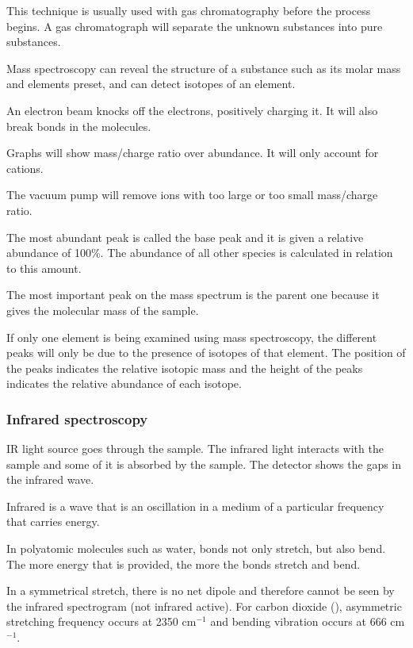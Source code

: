 			This technique is usually used with gas chromatography before the process begins. A gas chromatograph will separate the unknown substances into pure substances.

			Mass spectroscopy can reveal the structure of a substance such as its molar mass and elements preset, and can detect isotopes of an element.

			An electron beam knocks off the electrons, positively charging it. It will also break bonds in the molecules.

			Graphs will show mass/charge ratio over abundance. It will only account for cations.

			The vacuum pump will remove ions with too large or too small mass/charge ratio.

			The most abundant peak is called the base peak and it is given a relative abundance of 100\%. The abundance of all other species is calculated in relation to this amount.

			The most important peak on the mass spectrum is the parent one because it gives the molecular mass of the sample.

			If only one element is being examined using mass spectroscopy, the different peaks will only be due to the presence of isotopes of that element. The position of the peaks indicates the relative isotopic mass and the height of the peaks indicates the relative abundance of each isotope.

		\subsubsection{Infrared spectroscopy}

			IR light source goes through the sample. The infrared light interacts with the sample and some of it is absorbed by the sample. The detector shows the gaps in the infrared wave.

			Infrared is a wave that is an oscillation in a medium of a particular frequency that carries energy.

			In polyatomic molecules such as water, bonds not only stretch, but also bend. The more energy that is provided, the more the bonds stretch and bend.

			In a symmetrical stretch, there is no net dipole and therefore cannot be seen by the infrared spectrogram (not infrared active). For carbon dioxide (), asymmetric stretching frequency occurs at 2350 cm$^{-1}$ and bending vibration occurs at 666 cm$^{-1}$.

